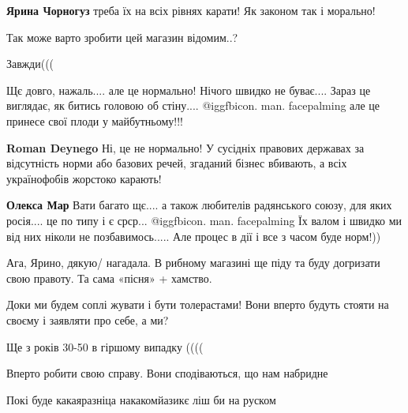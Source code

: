 \begin{itemize}
\textbf{Ярина Чорногуз} треба їх на всіх рівнях карати! Як законом так і морально!

Так може варто зробити цей магазин відомим..?

Завжди(((


Щє довго, нажаль.... але це нормально! Нічого швидко не буває.... Зараз це
виглядає, як битись головою об стіну.... @igg{fbicon. man. facepalming}  але це принесе свої плоди у
майбутньому!!!

\begin{itemize} %
\textbf{Roman Deynego} Ні, це не нормально! У сусідніх правових державах за відсутність норми або базових речей, згаданий бізнес вбивають, а всіх українофобів жорстоко карають!

\textbf{Олекса Мар} Вати багато щє.... а також любителів радянського союзу, для яких росія.... це по типу і є срср... @igg{fbicon. man. facepalming}  Їх валом і швидко ми від них ніколи не позбавимось..... Але процес в дії і все з часом буде норм!))
\end{itemize} %

Ага, Ярино, дякую/ нагадала. В рибному магазині ще піду та буду догризати свою правоту. Та сама «пісня» + хамство.

Доки ми будем соплі жувати і бути толерастами! Вони вперто будуть стояти на своєму і заявляти про себе, а ми?

Ще з років 30-50 в гіршому випадку ((((

Вперто робити свою справу. Вони сподіваються, що нам набридне

Покі буде какаяразніца накакомйазикє ліш би на руском

\end{itemize} %
